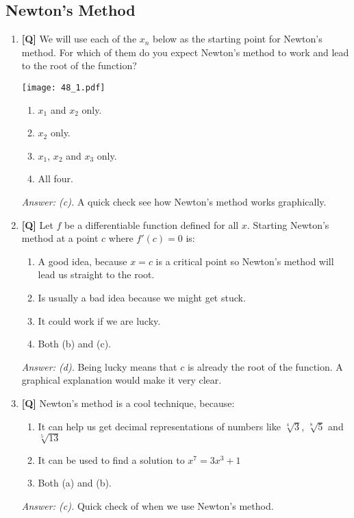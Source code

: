 \documentclass[12pt]{article}
\begin{document}
\pagebreak
\subsection{Newton's Method}

\begin{enumerate}

\item {\bf [Q]} We will use each of the $x_n$ below as the starting point for
 Newton's method. For which of them do you expect Newton's method
 to work and lead to the root of the function?

\begin{center}
\texttt{[image: 48\_1.pdf]}
\end{center}

\begin{enumerate}
\item $x_1$ and $x_2$ only.
\item $x_2$ only.
\item $x_1$, $x_2$ and $x_3$ only.
\item All four.
\end{enumerate}

{\it Answer: (c).} A quick check see how Newton's method works
graphically. 

\bigskip

\item {\bf [Q]} Let $f$ be a differentiable function defined for all $x$.
Starting Newton's method at a point $c$ where $f'(c)=0$ is:
\begin{enumerate}
\item A good idea, because $x=c$ is a critical point so Newton's
method will lead us straight to the root.
\item Is usually a bad idea because we might get stuck.
\item It could work if we are lucky.
\item Both (b) and (c).
\end{enumerate}

{\it Answer: (d).} Being lucky means that $c$ is already the
root of the function. A graphical explanation would make it very
clear. 

\bigskip

\item {\bf [Q]} Newton's method is a cool technique, because:
\begin{enumerate}
\item It can help us get decimal representations of numbers like
$\sqrt[4]{3}$, $\sqrt[8]{5}$ and $\sqrt[5]{13}$
\item It can be used to find a solution to $x^7=3x^3+1$
\item Both (a) and (b).
\end{enumerate}

{\it Answer: (c).} Quick check of when we use Newton's method.

\end{enumerate}
\end{document}
